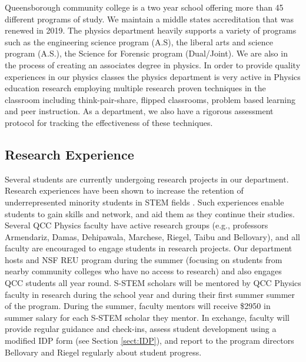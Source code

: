\documentclass[12pt]{article}
\newcommand\new[1]{{\color{blue}#1}}
\begin{document}

Queensborough community college is a two year school offering more than 45 different programs of study.  We maintain a middle states accreditation that was renewed in 2019.  The physics department heavily supports a variety of programs such as the engineering science program (A.S), the liberal arts and science program (A.S.), the Science for Forensic program (Dual/Joint).  We are also in the process of creating an associates degree in physics.  In order to provide quality experiences in our physics classes the physics department is very active in Physics education research employing multiple research proven techniques in the classroom including think-pair-share, flipped classrooms, problem based learning and peer instruction. As a department, we also have a rigorous assessment protocol for tracking the effectiveness of these techniques.
\subsection{Research Experience}
Several students are currently undergoing research projects in our department.  Research experiences have been shown to increase the retention of underrepresented minority students in STEM fields \citep{Graham,Russell}.   Such experiences  enable students to gain skills and network, and aid them as they continue their studies.  Several QCC Physics faculty have active research groups (e.g., professors Armendariz, Damas, Dehipawala, Marchese, Riegel, Taibu and Bellovary), and all faculty are encouraged to engage students in research projects.  Our department hosts and NSF REU program during the summer (focusing on students from nearby community colleges who have no access to research) and also engages QCC students all year round.  S-STEM scholars will be mentored by QCC Physics faculty in research during the school year and during their first summer summer of the program.  During the summer, faculty mentors will receive \$2950 in summer salary for each S-STEM scholar they mentor.  In exchange, faculty will provide regular guidance and check-ins, assess student development using a modified IDP form (see Section \ref{sect:IDP}), and report to the program directors Bellovary and Riegel regularly about student progress.  
\end{document}
